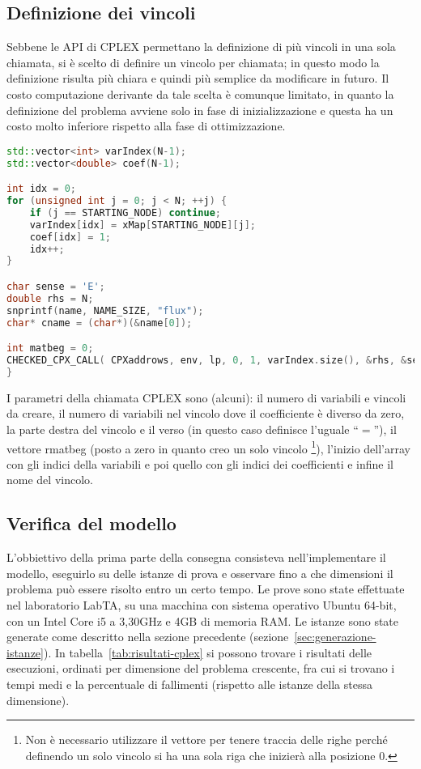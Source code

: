 \subsection{Definizione dei vincoli}
Sebbene le API di CPLEX permettano la definizione di più vincoli in una sola chiamata, si è scelto di definire un vincolo per chiamata;
in questo modo la definizione risulta più chiara e quindi più semplice da modificare in futuro.
Il costo computazione derivante da tale scelta è comunque limitato, in quanto la definizione del problema avviene solo in fase di inizializzazione
e questa ha un costo molto inferiore rispetto alla fase di ottimizzazione.
%
\label{lst:cplex-vincoli}
\begin{lstlisting}[language=C++, caption=Creazione di un vincolo]
std::vector<int> varIndex(N-1);
std::vector<double> coef(N-1);

int idx = 0;
for (unsigned int j = 0; j < N; ++j) {
	if (j == STARTING_NODE) continue;
	varIndex[idx] = xMap[STARTING_NODE][j];
	coef[idx] = 1;
	idx++;
}

char sense = 'E';
double rhs = N;
snprintf(name, NAME_SIZE, "flux");
char* cname = (char*)(&name[0]);

int matbeg = 0;
CHECKED_CPX_CALL( CPXaddrows, env, lp, 0, 1, varIndex.size(), &rhs, &sense, &matbeg, &varIndex[0], &coef[0], NULL, &cname );
}
\end{lstlisting}
%
I parametri della chiamata CPLEX sono (alcuni): il numero di variabili e vincoli da creare, il numero di variabili nel vincolo dove il coefficiente è
diverso da zero, la parte destra del vincolo e il verso (in questo caso definisce l'uguale ``$=$''), il vettore \textsf{rmatbeg} (posto a zero in quanto creo un solo vincolo
\footnote{Non è necessario utilizzare il vettore per tenere traccia delle righe perché definendo un solo vincolo si ha una sola riga che inizierà alla posizione 0.}),
l'inizio dell'array con gli indici della variabili e poi quello con gli indici dei coefficienti e infine il nome del vincolo.
\subsection{Verifica del modello}\label{subsec:verifica-modello-cplex}
L'obbiettivo della prima parte della consegna consisteva nell'implementare il modello, eseguirlo su delle istanze di prova
e osservare fino a che dimensioni il problema può essere risolto entro un certo tempo.
Le prove sono state effettuate nel laboratorio LabTA, su una macchina con sistema operativo Ubuntu 64-bit,
con un Intel Core i5 a 3,30GHz e 4GB di memoria RAM.
Le istanze sono state generate come descritto nella sezione precedente (sezione~\ref{sec:generazione-istanze}).
In tabella~\ref{tab:risultati-cplex} si possono trovare i risultati delle esecuzioni, ordinati per dimensione
del problema crescente, fra cui si trovano i tempi medi e la percentuale di fallimenti (rispetto alle istanze della stessa dimensione).


